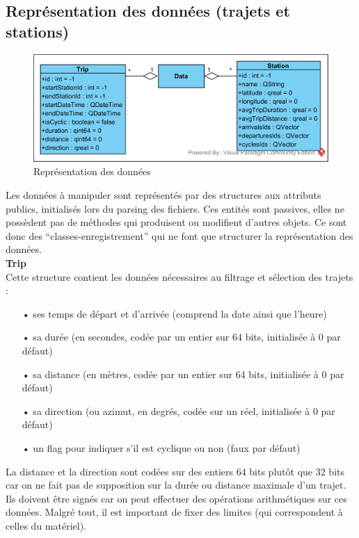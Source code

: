 \documentclass[12pt]{article}
\begin{document}
		\subsection{Représentation des données (trajets et stations)}
		\begin{figure}[!h]
		\begin{center}
		\includegraphics[scale=1]{dia_class_data.png}
		\caption{Représentation des données}
		\end{center}
		\end{figure}		
			
		Les données à manipuler sont représentés par des structures aux attributs publics,
		initialisés lors du parsing des fichiers. Ces entités sont passives, elles ne possèdent
		pas de méthodes qui produisent ou modifient d’autres objets. Ce sont
		donc des “classes-enregistrement” qui ne font que structurer la représentation des
		données.\\		
			
		\textbf{Trip}\\
		Cette structure contient les données nécessaires au filtrage et sélection des
		trajets :\\		
		\begin{itemize}
			\item[•]ses temps de départ et d’arrivée (comprend la date ainsi que l’heure)
			\item[•]sa durée (en secondes, codée par un entier sur 64 bits, initialisée à
			0 par défaut)
			\item[•]sa distance (en mètres, codée par un entier sur 64 bits, initialisée
			à 0 par défaut)
			\item[•]sa direction (ou azimut, en degrés, codée sur un réel, initialisée à
			0 par défaut)
			\item[•]un flag pour indiquer s’il est cyclique ou non (faux par défaut)\\
		\end{itemize}
			
		La distance et la direction sont codées sur des entiers 64 bits plutôt que 32 bits car on ne fait pas de supposition sur la durée ou distance maximale d’un trajet. Ils doivent être signés car on peut effectuer des opérations arithmétiques sur ces données. Malgré tout, il est important de fixer des limites (qui correspondent à celles du matériel).\\
			
\end{document}
